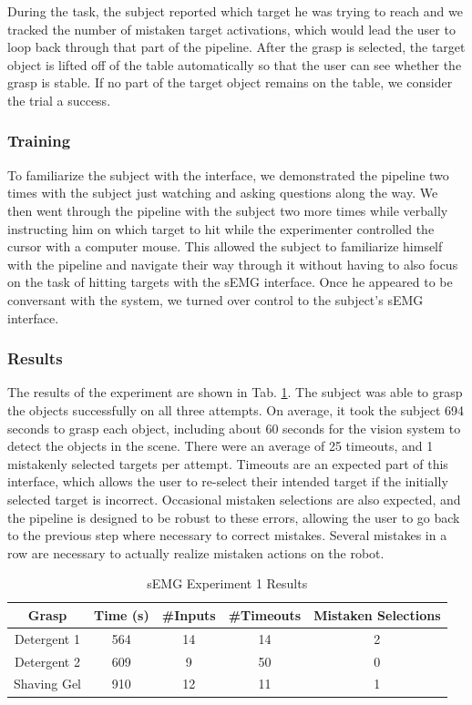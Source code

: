 During the task, the subject reported which target he was trying to reach and we tracked the number of mistaken target activations, which would lead the user to loop back through that part of the pipeline. After the grasp is selected, the target object is lifted off of the table automatically so that the user can see whether the grasp is stable. If no part of the target object remains on the table, we consider the trial a success.

\subsubsection{Training}
To familiarize the subject with the interface, we demonstrated the pipeline two times with the subject just watching and asking questions along the way. We then went through the pipeline with the subject two more times while verbally instructing him on which target to hit while the experimenter controlled the cursor with a computer mouse. This allowed the subject to familiarize himself with the pipeline and navigate their way through it without having to also focus on the task of hitting targets with the sEMG interface. Once he appeared to be conversant with the system, we turned over control to the subject's sEMG interface.

\subsubsection{Results}
The results of the experiment are shown in Tab. \ref{tab:semg_table_1}. The subject was able to grasp the objects successfully on all three attempts. On average, it took the subject 694 seconds to grasp each object, including about 60 seconds for the vision system to detect the objects in the scene. There were an average of 25 timeouts, and 1 mistakenly selected targets per attempt. Timeouts are an expected part of this interface, which allows the user to re-select their intended target if the initially selected target is incorrect. Occasional mistaken selections are also expected, and the pipeline is designed to be robust to these errors, allowing the user to go back to the previous step where necessary to correct mistakes. Several mistakes in a row are necessary to actually realize mistaken actions on the robot.


\begin{table}
\centering
\begin{tabular}{|c|c|c|c|c|}
\hline
Grasp & Time (s) & \#Inputs & \#Timeouts & Mistaken Selections \\ \hline
Detergent 1 & 564 & 14 & 14 & 2\\ \hline
Detergent 2 & 609 & 9 & 50 & 0\\ \hline
Shaving Gel & 910 & 12 & 11 & 1\\ \hline
\end{tabular}
\caption{sEMG Experiment 1 Results}
\label{tab:semg_table_1}
\end{table}

